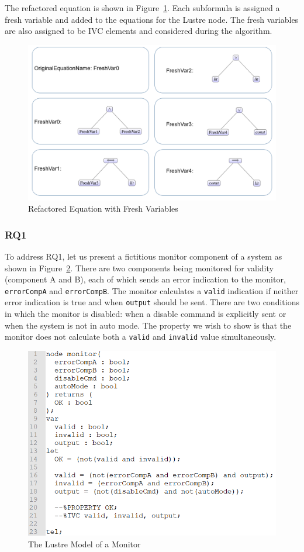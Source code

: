The refactored equation is shown in Figure~\ref{fig:freshVarsRename}. Each subformula is assigned a fresh variable and added to the equations for the Lustre node. The fresh variables are also assigned to be IVC elements and considered during the \aivcalg algorithm. 

\begin{figure}[h!]
\begin{center}
\includegraphics[width=.7\textwidth]{images/freshVars.PNG}
\caption{Refactored Equation with Fresh Variables} \label{fig:freshVarsRename}
\end{center}
\end{figure} 

\subsubsection{RQ1}
To address RQ1, let us present a fictitious monitor component of a system as shown in Figure~\ref{fig:monitorLustre}. There are two components being monitored for validity (component A and B), each of which sends an error indication to the monitor, \texttt{errorCompA} and \texttt{errorCompB}. The monitor calculates  a \texttt{valid} indication if neither error indication is true and when \texttt{output} should be sent. There are two conditions in which the monitor is disabled: when a disable command is explicitly sent or when the system is not in auto mode. The property we wish to show is that the monitor does not calculate both a \texttt{valid} and \texttt{invalid} value simultaneously. 
\begin{figure}[h!]
\begin{center}
\includegraphics[width=.8\textwidth]{images/monitorLustre.PNG}
\caption{The Lustre Model of a Monitor} 
\label{fig:monitorLustre}
\end{center}
\end{figure} 

